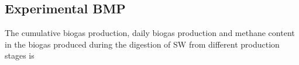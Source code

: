 \subsection{Experimental BMP}
The cumulative biogas production, daily biogas production and methane content in the biogas produced during the digestion of SW from different production stages is 